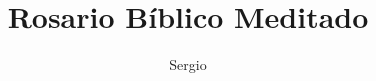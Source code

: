 \documentclass[11pt,a4paper]{report}
\title{Rosario Bíblico Meditado}
\author{Sergio}
\begin{document}
\begin{titlepage}
    \maketitle
\end{titlepage}





\newpage



\newpage



\newpage



\newpage


\end{document}
